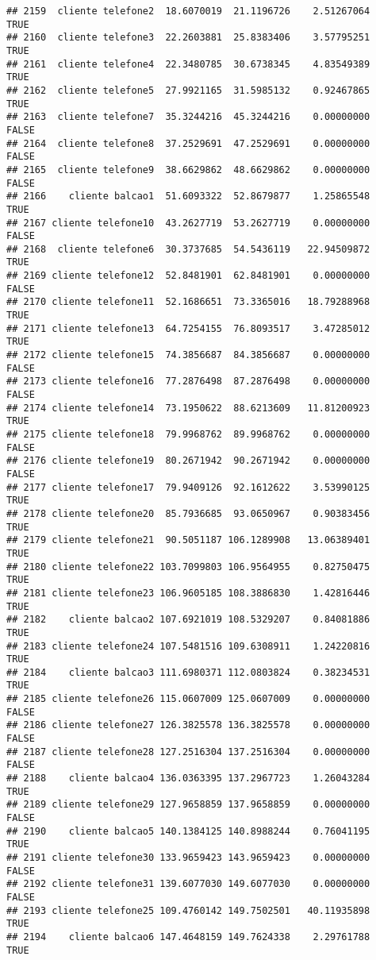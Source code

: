 \documentclass[
]{article}
\begin{document}
\begin{verbatim}
## 2159  cliente telefone2  18.6070019  21.1196726    2.51267064     TRUE
## 2160  cliente telefone3  22.2603881  25.8383406    3.57795251     TRUE
## 2161  cliente telefone4  22.3480785  30.6738345    4.83549389     TRUE
## 2162  cliente telefone5  27.9921165  31.5985132    0.92467865     TRUE
## 2163  cliente telefone7  35.3244216  45.3244216    0.00000000    FALSE
## 2164  cliente telefone8  37.2529691  47.2529691    0.00000000    FALSE
## 2165  cliente telefone9  38.6629862  48.6629862    0.00000000    FALSE
## 2166    cliente balcao1  51.6093322  52.8679877    1.25865548     TRUE
## 2167 cliente telefone10  43.2627719  53.2627719    0.00000000    FALSE
## 2168  cliente telefone6  30.3737685  54.5436119   22.94509872     TRUE
## 2169 cliente telefone12  52.8481901  62.8481901    0.00000000    FALSE
## 2170 cliente telefone11  52.1686651  73.3365016   18.79288968     TRUE
## 2171 cliente telefone13  64.7254155  76.8093517    3.47285012     TRUE
## 2172 cliente telefone15  74.3856687  84.3856687    0.00000000    FALSE
## 2173 cliente telefone16  77.2876498  87.2876498    0.00000000    FALSE
## 2174 cliente telefone14  73.1950622  88.6213609   11.81200923     TRUE
## 2175 cliente telefone18  79.9968762  89.9968762    0.00000000    FALSE
## 2176 cliente telefone19  80.2671942  90.2671942    0.00000000    FALSE
## 2177 cliente telefone17  79.9409126  92.1612622    3.53990125     TRUE
## 2178 cliente telefone20  85.7936685  93.0650967    0.90383456     TRUE
## 2179 cliente telefone21  90.5051187 106.1289908   13.06389401     TRUE
## 2180 cliente telefone22 103.7099803 106.9564955    0.82750475     TRUE
## 2181 cliente telefone23 106.9605185 108.3886830    1.42816446     TRUE
## 2182    cliente balcao2 107.6921019 108.5329207    0.84081886     TRUE
## 2183 cliente telefone24 107.5481516 109.6308911    1.24220816     TRUE
## 2184    cliente balcao3 111.6980371 112.0803824    0.38234531     TRUE
## 2185 cliente telefone26 115.0607009 125.0607009    0.00000000    FALSE
## 2186 cliente telefone27 126.3825578 136.3825578    0.00000000    FALSE
## 2187 cliente telefone28 127.2516304 137.2516304    0.00000000    FALSE
## 2188    cliente balcao4 136.0363395 137.2967723    1.26043284     TRUE
## 2189 cliente telefone29 127.9658859 137.9658859    0.00000000    FALSE
## 2190    cliente balcao5 140.1384125 140.8988244    0.76041195     TRUE
## 2191 cliente telefone30 133.9659423 143.9659423    0.00000000    FALSE
## 2192 cliente telefone31 139.6077030 149.6077030    0.00000000    FALSE
## 2193 cliente telefone25 109.4760142 149.7502501   40.11935898     TRUE
## 2194    cliente balcao6 147.4648159 149.7624338    2.29761788     TRUE

\end{verbatim}
\end{document}

